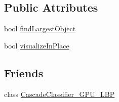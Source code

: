 \subsection*{Public Attributes}
\begin{DoxyCompactItemize}
\item 
bool \hyperlink{classcv_1_1gpu_1_1CascadeClassifier__GPU_ae2278404d7669cd4e98598791d6aac2d}{find\-Largest\-Object}
\item 
bool \hyperlink{classcv_1_1gpu_1_1CascadeClassifier__GPU_a46c3e4aacca43b5abe7fb048cb08c8f7}{visualize\-In\-Place}
\end{DoxyCompactItemize}
\subsection*{Friends}
\begin{DoxyCompactItemize}
\item 
class \hyperlink{classcv_1_1gpu_1_1CascadeClassifier__GPU_ae58dceeb75c1ee30c78466f3cf43114e}{Cascade\-Classifier\-\_\-\-G\-P\-U\-\_\-\-L\-B\-P}
\end{DoxyCompactItemize}


